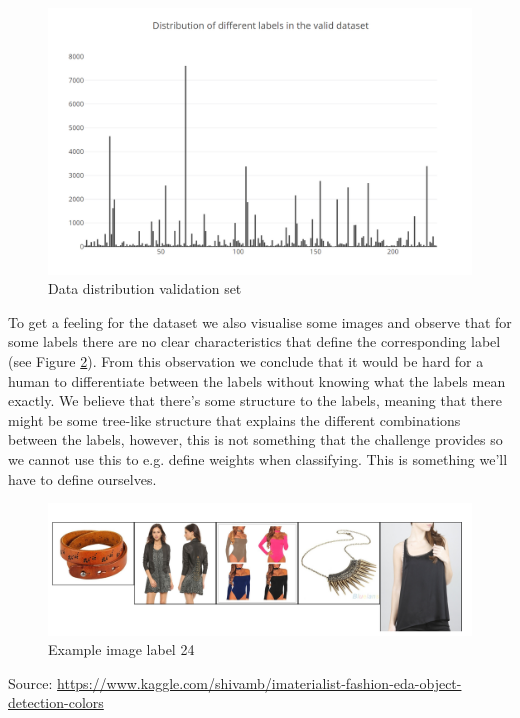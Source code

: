 \documentclass[10pt, a4paper]{article}
\begin{document}
	\begin{figure}[H]
        \centering
        \includegraphics[scale=.4]{img_imaterialist/dist_labels_validation.png}
        \caption{Data distribution validation set}
        \label{fig:data_dist_val}
    \end{figure}
    To get a feeling for the dataset we also visualise some images and observe that for some labels there are no clear characteristics that define the corresponding label (see Figure \ref{fig:img_example}). From this observation we conclude that it would be hard for a human to differentiate between the labels without knowing what the labels mean exactly. We believe that there's some structure to the labels, meaning that there might be some tree-like structure that explains the different combinations between the labels, however, this is not something that the challenge provides so we cannot use this to e.g. define weights when classifying. This is something we'll have to define ourselves.
	\begin{figure}[H]
        \centering
        \includegraphics[scale=.4]{img_imaterialist/label_24.jpg}
        \caption{Example image label 24}
        \label{fig:img_example}
    \end{figure}
    
    Source: \url{https://www.kaggle.com/shivamb/imaterialist-fashion-eda-object-detection-colors}
    
\end{document}

